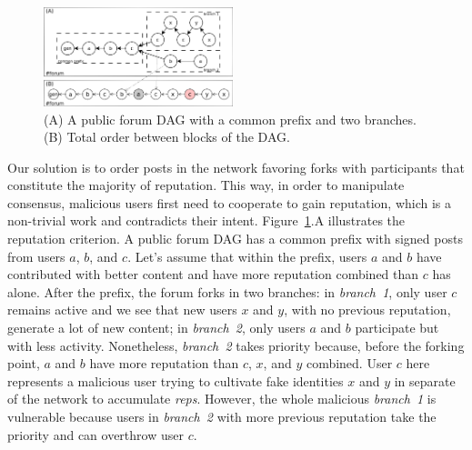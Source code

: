 \documentclass[10pt,journal,compsoc]{IEEEtran}
\newcommand{\reps}     {\emph{reps}\xspace}
\begin{document}
\begin{figure}
\centering
\includegraphics[width=0.49\textwidth]{reps2.png}
\caption{
    (A) A public forum DAG with a common prefix and two branches.
    (B) Total order between blocks of the DAG.
}
\label{fig.reps}
\end{figure}

Our solution is to order posts in the network favoring forks with participants
that constitute the majority of reputation.
This way, in order to manipulate consensus, malicious users first need to
cooperate to gain reputation, which is a non-trivial work and contradicts their
intent.
%
Figure~\ref{fig.reps}.A illustrates the reputation criterion.
A public forum DAG has a common prefix with signed posts from users $a$, $b$,
and $c$.
Let's assume that within the prefix, users $a$ and $b$ have contributed with
better content and have more reputation combined than $c$ has alone.
%
After the prefix, the forum forks in two branches:
in \emph{branch~1}, only user $c$ remains active and we see that new users $x$
and $y$, with no previous reputation, generate a lot of new content;
in \emph{branch~2}, only users $a$ and $b$ participate but with less activity.
Nonetheless, \emph{branch~2} takes priority because, before the forking point,
$a$ and $b$ have more reputation than $c$, $x$, and $y$ combined.
%
User $c$ here represents a malicious user trying to cultivate fake identities
$x$ and $y$ in separate of the network to accumulate \reps.
However, the whole malicious \emph{branch~1} is vulnerable because users in
\emph{branch~2} with more previous reputation take the priority and can
overthrow user $c$.
\end{document}

